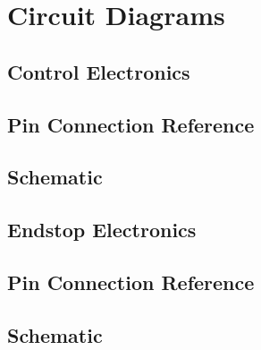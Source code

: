 \chapter{Circuit Diagrams}
	
	\section{Control Electronics}
		\label{sec:mainboardDiagrams}
		
		\section{Pin Connection Reference}
		
		\section{Schematic}
	
	\section{Endstop Electronics}
		
		\section{Pin Connection Reference}
		
		\section{Schematic}

